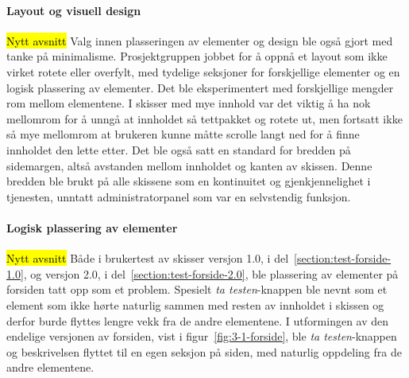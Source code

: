 \paragraph{Layout og visuell design}
\hl{Nytt avsnitt}
Valg innen plasseringen av elementer og design ble også gjort med tanke på minimalisme. Prosjektgruppen jobbet for å oppnå et layout som ikke virket rotete eller overfylt, med tydelige seksjoner for forskjellige elementer og en logisk plassering av elementer. Det ble eksperimentert med forskjellige mengder rom mellom elementene. I skisser med mye innhold var det viktig å ha nok mellomrom for å unngå at innholdet så tettpakket og rotete ut, men fortsatt ikke så mye mellomrom at brukeren kunne måtte scrolle langt ned for å finne innholdet den lette etter. Det ble også satt en standard for bredden på sidemargen, altså avstanden mellom innholdet og kanten av skissen. Denne bredden ble brukt på alle skissene som en kontinuitet og gjenkjennelighet i tjenesten, unntatt administratorpanel som var en selvstendig funksjon.

\paragraph{Logisk plassering av elementer}
\hl{Nytt avsnitt}
Både i brukertest av skisser versjon 1.0, i del~\ref{section:test-forside-1.0}, og versjon 2.0, i del~\ref{section:test-forside-2.0}, ble plassering av elementer på forsiden tatt opp som et problem. Spesielt {\em ta testen}-knappen ble nevnt som et element som ikke hørte naturlig sammen med resten av innholdet i skissen og derfor burde flyttes lengre vekk fra de andre elementene. I utformingen av den endelige versjonen av forsiden, vist i figur~\ref{fig:3-1-forside}, ble {\em ta testen}-knappen og beskrivelsen flyttet til en egen seksjon på siden, med naturlig oppdeling fra de andre elementene.

